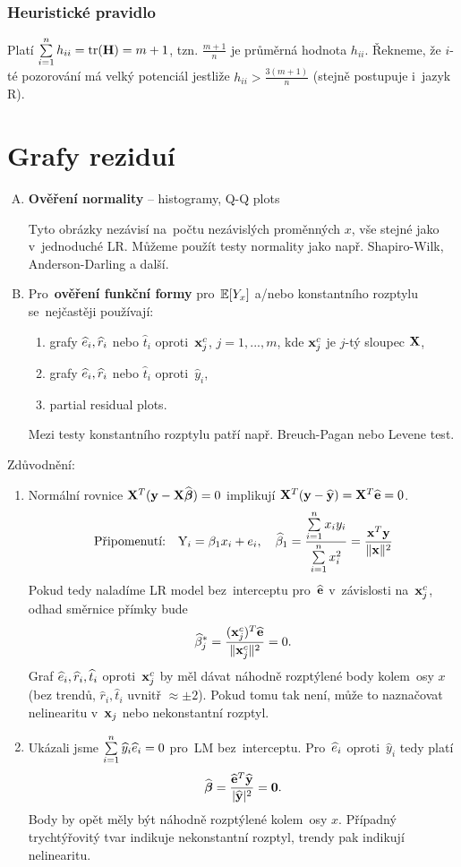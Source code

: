 \subsubsection{Heuristické pravidlo}
Platí $\sum\limits_{i=1}^{n} h_{ii} = \text{tr}(\textbf{H}) = m + 1$, tzn. $\frac{m+1}{n}$ je průměrná hodnota $h_{ii}$. Řekneme, že $i$-té pozorování má velký potenciál jestliže $h_{ii} > \frac{3(m+1)}{n}$ (stejně postupuje i~jazyk R).

\section{Grafy reziduí}
\begin{enumerate}[A)]
\item \textbf{Ověření normality} -- histogramy, Q-Q plots

Tyto obrázky nezávisí na~počtu nezávislých proměnných $x$, vše stejné jako v~jednoduché LR. Můžeme použít testy normality jako např. Shapiro-Wilk, Anderson-Darling a další.
\item Pro~\textbf{ověření funkční formy} pro~$\mathbb{E} [Y_x]$ a/nebo konstantního rozptylu se~nejčastěji používají:
\begin{enumerate}[1)]
\item grafy $\widehat{e}_i, \widehat{r}_i$ nebo $\widehat{t}_i$ oproti~$\mathbf{x}_j^c$, $j = 1,..., m$, kde $\mathbf{x}_j^c$ je $j$-tý sloupec $\mathbf{X}$,
\item grafy $\widehat{e}_i, \widehat{r}_i$ nebo $\widehat{t}_i$ oproti~$\widehat{y}_i$,
\item partial residual plots.
\end{enumerate}
Mezi testy konstantního rozptylu patří např. Breuch-Pagan nebo Levene test.
\end{enumerate}

\begin{remark}
Zdůvodnění:
\begin{enumerate}
\item Normální rovnice $\mathbf{X}^T (\mathbf{y} - \mathbf{X} \widehat{\boldsymbol{\beta}}) = 0$ implikují $\mathbf{X}^T (\mathbf{y} - \widehat{\mathbf{y}}) = \mathbf{X}^T \widehat{\mathbf{e}} = 0$.
 $$
 \text{Připomenutí:} \quad \text{Y}_i = \beta_1 x_i + e_i, \quad \widehat{\beta}_1 = \frac{\sum\limits_{i=1}^{n} x_i y_i}{\sum\limits_{i=1}^{n} x_i^2} = \frac{\mathbf{x}^T\mathbf{y}}{\| \mathbf{x} \|^2 }
 $$
Pokud tedy naladíme LR model bez~interceptu pro~$\widehat{\mathbf{e}}$ v~závislosti na~$\mathbf{x}_j^c$, odhad směrnice přímky bude
 $$
  \widehat{\beta}_j^* = \frac{(\mathbf{x}_j^c)^T \widehat{\mathbf{e}}}{\| \mathbf{x}_j^c \|^2} = 0.
 $$
Graf $\widehat{e}_i, \widehat{r}_i, \widehat{t}_i$ oproti~$\mathbf{x}_j^c$ by měl dávat náhodně rozptýlené body kolem~osy $x$ (bez trendů, $\widehat{r}_i, \widehat{t}_i$ uvnitř $\approx \pm 2$).
Pokud tomu tak není, může to naznačovat nelinearitu v~$\mathbf{x}_j$ nebo nekonstantní rozptyl.
\item Ukázali jsme $\sum\limits_{i=1}^{n} \widehat{y}_i \widehat{e}_i = 0$ pro~LM bez~interceptu. Pro~$\widehat{e}_i$ oproti~$\widehat{y}_i$ tedy platí
 $$
  \widehat{\boldsymbol{\beta}} = \frac{\widehat{\mathbf{e}}^T \widehat{\mathbf{y}}}{| \widehat{\mathbf{y}} |^2} = \boldsymbol{0}.
 $$
Body by opět měly být náhodně rozptýlené kolem~osy $x$. Případný trychtýřovitý tvar indikuje nekonstantní rozptyl, trendy pak indikují nelinearitu.
\end{enumerate}	
\end{remark}

